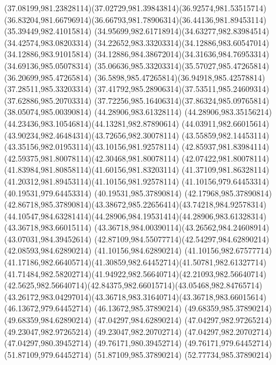 {{	\curveto(37.08199,981.23828114)(37.02729,981.39843814)(36.92574,981.53515714)
	\curveto(36.83204,981.66796914)(36.66793,981.78906314)(36.44136,981.89453114)
	\lineto(35.39449,982.41015814)
	\curveto(34.95699,982.61718914)(34.63277,982.83984514)(34.42574,983.08203314)
	\curveto(34.22652,983.33203314)(34.12886,983.60547014)(34.12886,983.91015814)
	\curveto(34.12886,984.38672014)(34.31636,984.76953314)(34.69136,985.05078314)
	\curveto(35.06636,985.33203314)(35.57027,985.47265814)(36.20699,985.47265814)
	\curveto(36.5898,985.47265814)(36.94918,985.42578814)(37.28511,985.33203314)
	\curveto(37.41792,985.28906314)(37.53511,985.24609314)(37.62886,985.20703314)
	\curveto(37.72256,985.16406314)(37.86324,985.09765814)(38.05074,985.00390814)
	\closepath
	\moveto(44.28906,983.61328114)
	\curveto(44.28906,983.35156214)(44.23436,983.10546814)(44.13281,982.87890614)
	\curveto(44.03911,982.66015614)(43.90234,982.46484314)(43.72656,982.30078114)
	\curveto(43.55859,982.14453114)(43.35156,982.01953114)(43.10156,981.92578114)
	\curveto(42.85937,981.83984114)(42.59375,981.80078114)(42.30468,981.80078114)
	\curveto(42.07422,981.80078114)(41.83984,981.80858114)(41.60156,981.83203114)
	\curveto(41.37109,981.86328114)(41.20312,981.89453114)(41.10156,981.92578114)
	\lineto(41.10156,979.64453314)
	\lineto(40.19531,979.64453314)
	\lineto(40.19531,985.37890814)
	\lineto(42.17968,985.37890814)
	\curveto(42.86718,985.37890814)(43.38672,985.22656414)(43.74218,984.92578314)
	\curveto(44.10547,984.63281414)(44.28906,984.19531414)(44.28906,983.61328314)
	\closepath
	\moveto(43.36718,983.66015114)
	\curveto(43.36718,984.00390114)(43.26562,984.24608914)(43.07031,984.39452614)
	\curveto(42.87109,984.55077714)(42.54297,984.62890214)(42.08593,984.62890214)
	\lineto(41.10156,984.62890214)
	\lineto(41.10156,982.67577714)
	\curveto(41.17186,982.66405714)(41.30859,982.64452714)(41.50781,982.61327714)
	\curveto(41.71484,982.58202714)(41.94922,982.56640714)(42.21093,982.56640714)
	\curveto(42.5625,982.56640714)(42.84375,982.66015714)(43.05468,982.84765714)
	\curveto(43.26172,983.04297014)(43.36718,983.31640714)(43.36718,983.66015614)
	\closepath
	\moveto(46.13672,979.64452714)
	\lineto(46.13672,985.37890214)
	\lineto(49.68359,985.37890214)
	\lineto(49.68359,984.62890214)
	\lineto(47.04297,984.62890214)
	\lineto(47.04297,982.97265214)
	\lineto(49.23047,982.97265214)
	\lineto(49.23047,982.20702714)
	\lineto(47.04297,982.20702714)
	\lineto(47.04297,980.39452714)
	\lineto(49.76171,980.39452714)
	\lineto(49.76171,979.64452714)
	\closepath
	\moveto(51.87109,979.64452714)
	\lineto(51.87109,985.37890214)
	\lineto(52.77734,985.37890214)
}}
